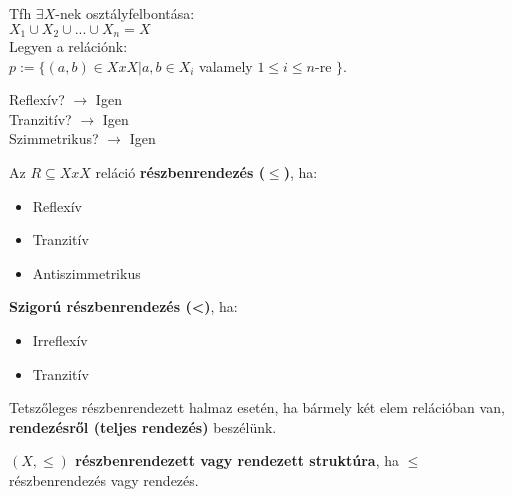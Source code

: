 \begin{frame}
\begin{tcolorbox}[title={Tétel: Ekvivalenciareláció és osztályfelbontás kapcsolata}]
Tfh ${\exists}X$-nek osztályfelbontása:\\

$X_1 \cup X_2 \cup ... \cup X_n = X$\\

Legyen a relációnk:\\

$p := \{(a,b) \in X x X | a, b \in X_i$ valamely $1 \leq i \leq n$-re $\}$.\\
\mmedskip

Reflexív? $\rightarrow$ Igen\\
Tranzitív? $\rightarrow$ Igen\\
Szimmetrikus? $\rightarrow$ Igen
\end{tcolorbox}
\end{frame}


\begin{frame}
\begin{tcolorbox}[title={Def.: Részbenrendezés, Szigorú részbenrendezés}]
Az $R \subseteq X x X$ reláció \textbf{részbenrendezés (${\leq}$)}, ha:\\
\begin{itemize}
\item Reflexív
\item Tranzitív
\item Antiszimmetrikus
\end{itemize}
\mmedskip

\textbf{Szigorú részbenrendezés (<)}, ha:\\
\begin{itemize}
\item Irreflexív
\item Tranzitív
\end{itemize}
\end{tcolorbox}

\begin{tcolorbox}[title={Def.: Teljes rendezés}]
Tetszőleges részbenrendezett halmaz esetén, ha bármely két elem relációban van, \textbf{rendezésről (teljes rendezés)} beszélünk.
\end{tcolorbox}

\begin{tcolorbox}[title={Def.: Részbenrendezett, vagy rendezett struktúra}]
\textbf{$(X, {\leq})$ részbenrendezett vagy rendezett struktúra}, ha ${\leq}$ részbenrendezés vagy rendezés.
\end{tcolorbox}

\begin{tcolorbox}[title={Def.: Diagonális reláció}]
\end{tcolorbox}


\end{frame}
